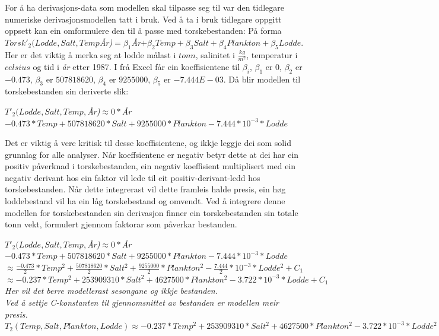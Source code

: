 \documentclass{report}
\begin{document}
For å ha derivasjons-data som modellen skal tilpasse seg til var den tidlegare numeriske derivasjonsmodellen tatt i bruk.
Ved å ta i bruk tidlegare oppgitt oppsett kan ein omformulere den til å passe med torskebestanden: \newline
På forma $Torsk'_{2}(Lodde,Salt,Temp$\textit{År)}$=\beta_1$\textit{År}$ +\beta_2 Temp+ \beta_3 Salt + \beta_4 Plankton+\beta_5 Lodde$.
Her er det viktig å merka seg at lodde målast i $tonn$, salinitet i $\frac{kg}{m^2}$, temperatur i $celsius$ og tid i \textit{år} etter 1987.
I frå Excel får ein koeffisientene til $\beta_i$, $\beta_1$ er $0$, $\beta_2$ er $-0.473$, $\beta_3$ er $507818620$, $\beta_4$ er $9255000$, $\beta_5$ er $-7.444E-03$.
Då blir modellen til torskebestanden sin deriverte slik:
\begin{center}
	$T'_{2}(Lodde,Salt,Temp,$\textit{År)}$ \approx 0*$\textit{År}$ -0.473*Temp + 507818620*Salt + 9255000*Plankton - 7.444*10^{-3}*Lodde$
\end{center}
Det er viktig å vere kritisk til desse koeffisientene, og ikkje leggje dei som solid grunnlag for alle analyser.
Når koeffsientene er negativ betyr dette at dei har ein positiv påverknad i torskebestanden, ein negativ koeffisient multiplisert med ein negativ derivant hos ein faktor vil lede til eit positiv-derivant-ledd hos torskebestanden.
Når dette integrerast vil dette framleis halde presis, ein høg loddebestand vil ha ein låg torskebestand og omvendt.
Ved å integrere denne modellen for torskebestanden sin derivasjon finner ein torskebestanden sin totale tonn vekt, formulert gjennom faktorar som påverkar bestanden.

\begin{center}
	$T'_{2}(Lodde,Salt,Temp,$\textit{År)}$ \approx 0*$\textit{År}$-0.473*Temp + 507818620*Salt + 9255000*Plankton - 7.444*10^{-3}*Lodde $\\
	$\approx \frac{-0.473}{2}*Temp^2 + \frac{507818620}{2}*Salt^2 + \frac{9255000}{2}*Plankton^2  -\frac{7.444}{2}*10^{-3}*Lodde^2 + C_1$\\
	$\approx -0.237*Temp^2 + 253909310*Salt^2 + 4627500*Plankton^2 -3.722*10^{-3}*Lodde + C_1$\\
	\textit{Her vil det berre modellerast sesongane og ikkje bestanden.}\\
	\textit{Ved å settje C-konstanten til gjennomsnittet av bestanden er modellen meir presis.}\\
	$T_{2}(Temp,Salt,Plankton,Lodde) \approx -0.237*Temp^2 + 253909310*Salt^2 + 4627500*Plankton^2 -3.722*10^{-3}*Lodde^2 + 531481$
\end{center}
\end{document}
